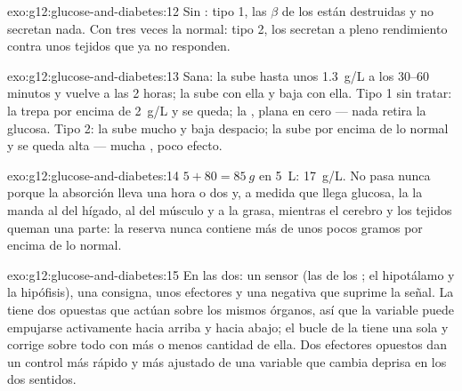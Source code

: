 \begin{solution}{exo:g12:glucose-and-diabetes:12}
Sin : tipo 1, las  $\beta$ de los  están
destruidas y no secretan nada. Con tres veces la  normal: tipo
2, los  secretan a pleno rendimiento contra unos tejidos que ya
no responden.
\end{solution}

\begin{solution}{exo:g12:glucose-and-diabetes:13}
Sana: la  sube hasta unos \qty{1.3}{g/L} a los 30--60 minutos y
vuelve a las 2 horas; la  sube con ella y baja con ella. Tipo 1
sin tratar: la  trepa por encima de \qty{2}{g/L} y se queda; la
, plana en cero --- nada retira la glucosa. Tipo 2: la 
sube mucho y baja despacio; la  sube por encima de lo normal y
se queda alta --- mucha , poco efecto.
\end{solution}

\begin{solution}{exo:g12:glucose-and-diabetes:14}
$5 + 80 = \qty{85}{g}$ en \qty{5}{L}: \qty{17}{g/L}. No pasa nunca
porque la absorción lleva una hora o dos y, a medida que llega glucosa,
la  la manda al  del hígado, al del músculo y a la
grasa, mientras el cerebro y los tejidos queman una parte: la reserva
nunca contiene más de unos pocos gramos por encima de lo normal.
\end{solution}

\begin{solution}{exo:g12:glucose-and-diabetes:15}
En las dos: un sensor (las  de los ; el hipotálamo y la
hipófisis), una consigna, unos efectores y una 
negativa que suprime la señal. La  tiene dos  opuestas
que actúan sobre los mismos órganos, así que la variable puede
empujarse activamente hacia arriba y hacia abajo; el bucle de la
 tiene una sola  y corrige sobre todo con más o
menos cantidad de ella. Dos efectores opuestos dan un control más
rápido y más ajustado de una variable que cambia deprisa en los dos
sentidos.
\end{solution}

